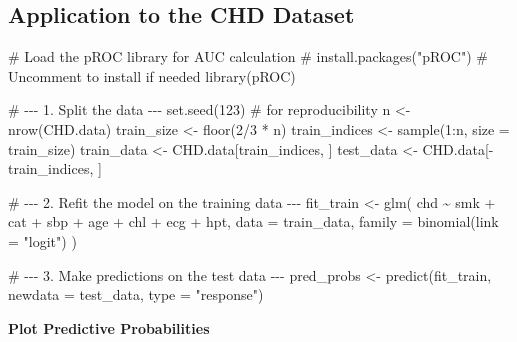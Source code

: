 \documentclass[
  letterpaper,
  DIV=11,
  numbers=noendperiod]{scrreprt}
\newenvironment{Shaded}{\begin{snugshade}}{\end{snugshade}}
\newcommand{\AttributeTok}[1]{\textcolor[rgb]{0.40,0.45,0.13}{#1}}
\newcommand{\CommentTok}[1]{\textcolor[rgb]{0.37,0.37,0.37}{#1}}
\newcommand{\DecValTok}[1]{\textcolor[rgb]{0.68,0.00,0.00}{#1}}
\newcommand{\FunctionTok}[1]{\textcolor[rgb]{0.28,0.35,0.67}{#1}}
\newcommand{\NormalTok}[1]{\textcolor[rgb]{0.00,0.23,0.31}{#1}}
\newcommand{\OtherTok}[1]{\textcolor[rgb]{0.00,0.23,0.31}{#1}}
\newcommand{\SpecialCharTok}[1]{\textcolor[rgb]{0.37,0.37,0.37}{#1}}
\newcommand{\StringTok}[1]{\textcolor[rgb]{0.13,0.47,0.30}{#1}}
\begin{document}
\subsection{Application to the CHD
Dataset}\label{application-to-the-chd-dataset}

\begin{Shaded}
\begin{Highlighting}[]
\CommentTok{\# Load the pROC library for AUC calculation}
\CommentTok{\# install.packages("pROC") \# Uncomment to install if needed}
\FunctionTok{library}\NormalTok{(pROC)}

\CommentTok{\# {-}{-}{-} 1. Split the data {-}{-}{-}}
\FunctionTok{set.seed}\NormalTok{(}\DecValTok{123}\NormalTok{) }\CommentTok{\# for reproducibility}
\NormalTok{n }\OtherTok{\textless{}{-}} \FunctionTok{nrow}\NormalTok{(CHD.data)}
\NormalTok{train\_size }\OtherTok{\textless{}{-}} \FunctionTok{floor}\NormalTok{(}\DecValTok{2}\SpecialCharTok{/}\DecValTok{3} \SpecialCharTok{*}\NormalTok{ n)}
\NormalTok{train\_indices }\OtherTok{\textless{}{-}} \FunctionTok{sample}\NormalTok{(}\DecValTok{1}\SpecialCharTok{:}\NormalTok{n, }\AttributeTok{size =}\NormalTok{ train\_size)}
\NormalTok{train\_data }\OtherTok{\textless{}{-}}\NormalTok{ CHD.data[train\_indices, ]}
\NormalTok{test\_data  }\OtherTok{\textless{}{-}}\NormalTok{ CHD.data[}\SpecialCharTok{{-}}\NormalTok{train\_indices, ]}

\CommentTok{\# {-}{-}{-} 2. Refit the model on the training data {-}{-}{-}}
\NormalTok{fit\_train }\OtherTok{\textless{}{-}} \FunctionTok{glm}\NormalTok{(}
\NormalTok{  chd }\SpecialCharTok{\textasciitilde{}}\NormalTok{ smk }\SpecialCharTok{+}\NormalTok{ cat }\SpecialCharTok{+}\NormalTok{ sbp }\SpecialCharTok{+}\NormalTok{ age }\SpecialCharTok{+}\NormalTok{ chl }\SpecialCharTok{+}\NormalTok{ ecg }\SpecialCharTok{+}\NormalTok{ hpt,}
  \AttributeTok{data =}\NormalTok{ train\_data,}
  \AttributeTok{family =} \FunctionTok{binomial}\NormalTok{(}\AttributeTok{link =} \StringTok{"logit"}\NormalTok{)}
\NormalTok{)}

\CommentTok{\# {-}{-}{-} 3. Make predictions on the test data {-}{-}{-}}
\NormalTok{pred\_probs }\OtherTok{\textless{}{-}} \FunctionTok{predict}\NormalTok{(fit\_train, }\AttributeTok{newdata =}\NormalTok{ test\_data, }\AttributeTok{type =} \StringTok{"response"}\NormalTok{)}
\end{Highlighting}
\end{Shaded}

\textbf{Plot Predictive Probabilities}
\end{document}
